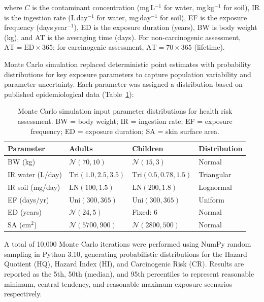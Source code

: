 \documentclass[preprint,12pt,authoryear]{elsarticle}
\begin{document}
\noindent where $C$ is the contaminant concentration (mg\,L$^{-1}$ for water, mg\,kg$^{-1}$ for soil), IR is the ingestion rate (L\,day$^{-1}$ for water, mg\,day$^{-1}$ for soil), EF is the exposure frequency (days\,year$^{-1}$), ED is the exposure duration (years), BW is body weight (kg), and AT is the averaging time (days). For non-carcinogenic assessment, $\text{AT} = \text{ED} \times 365$; for carcinogenic assessment, $\text{AT} = 70 \times 365$ (lifetime).

Monte Carlo simulation replaced deterministic point estimates with probability distributions for key exposure parameters to capture population variability and parameter uncertainty. Each parameter was assigned a distribution based on published epidemiological data (Table~\ref{tab:mc_params}):

\begin{table}[h!]
\centering
\caption{Monte Carlo simulation input parameter distributions for health risk assessment. BW = body weight; IR = ingestion rate; EF = exposure frequency; ED = exposure duration; SA = skin surface area.}
\label{tab:mc_params}
\small
\begin{tabular}{llll}
\toprule
Parameter & Adults & Children & Distribution \\
\midrule
BW (kg) & $\mathcal{N}(70, 10)$ & $\mathcal{N}(15, 3)$ & Normal \\
IR water (L/day) & $\text{Tri}(1.0, 2.5, 3.5)$ & $\text{Tri}(0.5, 0.78, 1.5)$ & Triangular \\
IR soil (mg/day) & $\text{LN}(100, 1.5)$ & $\text{LN}(200, 1.8)$ & Lognormal \\
EF (days/yr) & $\text{Uni}(300, 365)$ & $\text{Uni}(300, 365)$ & Uniform \\
ED (years) & $\mathcal{N}(24, 5)$ & Fixed: 6 & Normal \\
SA (cm$^{2}$) & $\mathcal{N}(5700, 900)$ & $\mathcal{N}(2800, 500)$ & Normal \\
\bottomrule
\end{tabular}
\end{table}

\noindent A total of 10,000 Monte Carlo iterations were performed using NumPy random sampling in Python 3.10, generating probabilistic distributions for the Hazard Quotient (HQ), Hazard Index (HI), and Carcinogenic Risk (CR). Results are reported as the 5th, 50th (median), and 95th percentiles to represent reasonable minimum, central tendency, and reasonable maximum exposure scenarios respectively.
\end{document}
